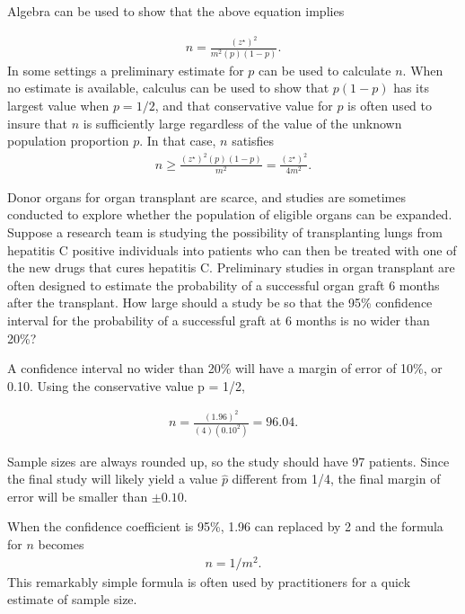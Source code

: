 Algebra can be used to show that the above equation implies

\begin{align*}
n = \frac{(z^{\star})^2}{m^2(p)(1 - p)}.
\end{align*}
In some settings a preliminary estimate for $p$ can be used to calculate $n$.  When no estimate is available, calculus can be used to show that $p(1 - p)$ has its largest value when $p = 1/2$, and that conservative value for $p$ is often used to insure that $n$ is sufficiently large regardless of the value of the unknown population proportion $p$.  In  that case, $n$ satisfies
\begin{align*}
  n \geq \frac{(z^{\star})^2(p)(1-p)}{m^2} = \frac{(z^{\star})^2}{4m^2}.
\end{align*}

\begin{example} {Donor organs for organ transplant are scarce, and studies are sometimes conducted to explore whether the population of eligible organs can be expanded. Suppose a research team is studying the possibility of transplanting lungs from hepatitis C positive individuals into patients who can then be treated with one of the new drugs that cures hepatitis C. Preliminary studies in organ transplant are often designed to estimate the probability of a successful organ graft 6 months after the transplant.  How large should a study be so that the 95\% confidence interval for the probability of a successful graft at 6 months is no wider than 20\%?}

A confidence interval no wider than 20\% will have a margin of error of 10\%, or 0.10.  Using the conservative value p = 1/2,

 \begin{align*}
    n = \frac{(1.96)^2}{(4)(0.10^2)} =  96.04.
\end{align*}

Sample sizes are always rounded up, so the study should have 97 patients.  Since the final study will likely yield a value $\hat{p}$ different from 1/4, the final margin of error will be smaller than $\pm 0.10$.
\end{example}

When the confidence coefficient is 95\%, 1.96 can replaced by 2 and the formula for $n$ becomes
\begin{align*}
  n = 1/m^2.
\end{align*}
This remarkably simple formula is often used by practitioners for a quick estimate of sample size.

